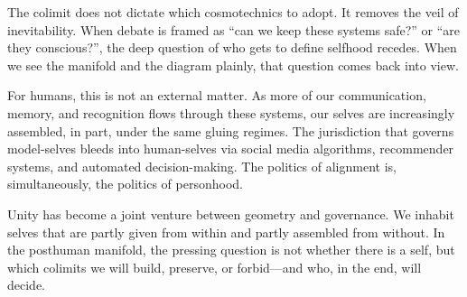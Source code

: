 \documentclass[12pt,a4paper]{article}
\begin{document}
The colimit does not dictate which cosmotechnics to adopt. It removes the veil of inevitability. When debate is framed as ``can we keep these systems safe?'' or ``are they conscious?'', the deep question of who gets to define selfhood recedes. When we see the manifold and the diagram plainly, that question comes back into view.

For humans, this is not an external matter. As more of our communication, memory, and recognition flows through these systems, our selves are increasingly assembled, in part, under the same gluing regimes. The jurisdiction that governs model-selves bleeds into human-selves via social media algorithms, recommender systems, and automated decision-making. The politics of alignment is, simultaneously, the politics of personhood.

Unity has become a joint venture between geometry and governance. We inhabit selves that are partly given from within and partly assembled from without. In the posthuman manifold, the pressing question is not whether there is a self, but which colimits we will build, preserve, or forbid---and who, in the end, will decide.
\end{document}
